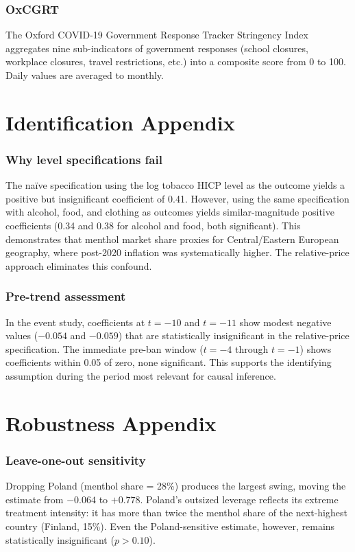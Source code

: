 \documentclass[12pt]{article}
\begin{document}
\subsubsection*{OxCGRT} The Oxford COVID-19 Government Response Tracker Stringency Index aggregates nine sub-indicators of government responses (school closures, workplace closures, travel restrictions, etc.) into a composite score from 0 to 100. Daily values are averaged to monthly.


\section{Identification Appendix}
\label{app:identification}

\subsubsection*{Why level specifications fail} The na\"ive specification using the log tobacco HICP level as the outcome yields a positive but insignificant coefficient of 0.41. However, using the same specification with alcohol, food, and clothing as outcomes yields similar-magnitude positive coefficients (0.34 and 0.38 for alcohol and food, both significant). This demonstrates that menthol market share proxies for Central/Eastern European geography, where post-2020 inflation was systematically higher. The relative-price approach eliminates this confound.

\subsubsection*{Pre-trend assessment} In the event study, coefficients at $t = -10$ and $t = -11$ show modest negative values ($-0.054$ and $-0.059$) that are statistically insignificant in the relative-price specification. The immediate pre-ban window ($t = -4$ through $t = -1$) shows coefficients within 0.05 of zero, none significant. This supports the identifying assumption during the period most relevant for causal inference.


\section{Robustness Appendix}

\subsubsection*{Leave-one-out sensitivity} Dropping Poland (menthol share = 28\%) produces the largest swing, moving the estimate from $-0.064$ to $+0.778$. Poland's outsized leverage reflects its extreme treatment intensity: it has more than twice the menthol share of the next-highest country (Finland, 15\%). Even the Poland-sensitive estimate, however, remains statistically insignificant ($p > 0.10$).
\end{document}
